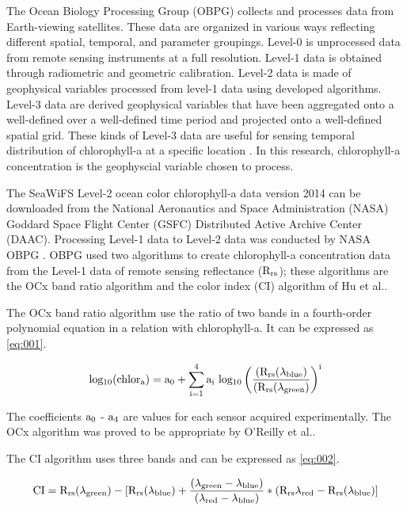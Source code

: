 The Ocean Biology Processing Group (OBPG) collects and processes data from Earth-viewing satellites. These data are organized in various ways reflecting different spatial, temporal, and parameter groupings. Level-0 is unprocessed data from remote sensing instruments at a full resolution. Level-1 data is obtained through radiometric and geometric calibration. Level-2 data is made of geophysical variables processed from level-1 data using developed algorithms. Level-3 data are derived geophysical variables that have been aggregated onto a well-defined over a well-defined time period and projected onto a well-defined spatial grid. These kinds of Level-3 data are useful for sensing temporal distribution of chlorophyll-a at a specific location \cite{feldman2017ocean}. In this research, chlorophyll-a concentration is the geophyscial variable chosen to process.

The SeaWiFS Level-2 ocean color chlorophyll-a data version 2014 can be downloaded from the National Aeronautics and Space Administration (NASA) Goddard Space Flight Center (GSFC) Distributed Active Archive Center (DAAC). Processing Level-1 data to Level-2 data was conducted by NASA OBPG \cite{NASASeaFiWSdata}. OBPG used two algorithms to create chlorophyll-a concentration data from the Level-1 data of remote sensing reflectance ($\rm R_{rs}$); these algorithms are the OCx band ratio algorithm and the color index (CI) algorithm of Hu et al.\cite{hu2012chlorophyll}. 

The OCx band ratio algorithm use the ratio of two bands in a fourth-order polynomial equation in a relation with chlorophyll-a. It can be expressed as \eqref{eq:001}.
 
 \begin{equation}
 {\rm log_{10} (chlor_a) = a_0 + \sum_{i=1}^4 a_i ~ log_{10} \left( \frac{(R_{rs}(\lambda_{blue})}{(R_{rs}(\lambda_{green})} \right) ^i }
 \label{eq:001}
 \end{equation}
 
The coefficients $\rm a_0$ - $\rm a_4$ are values for each sensor acquired experimentally. The OCx algorithm was proved to be appropriate by O’Reilly et al.\cite{o2000ocean}. 

The CI algorithm uses three bands and can be expressed as \eqref{eq:002}.

 \begin{equation}
{\rm CI = R_{rs} ({\lambda}_{green}) - [R_{rs} ({\lambda}_{blue}) + \frac {({\lambda}_{green} - {\lambda}_{blue})} {({\lambda}_{red} - {\lambda}_{blue})} * (R_{rs}{\lambda}_{red} - R_{rs} ({\lambda}_{blue}) ]}
\label{eq:002}
\end{equation}

